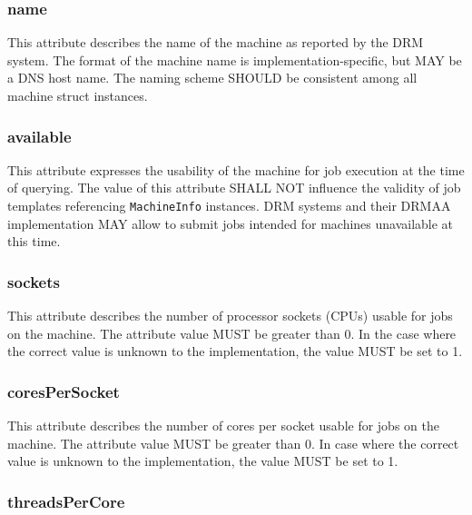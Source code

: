 \documentclass{article}
\newcommand{\h}[1]{\lstinline|#1|}
\newcommand{\rat}[1]{}
\begin{document}


\subsubsection{name}

This attribute describes the name of the machine as reported by the DRM system. The format of the machine name is implementation-specific, but MAY be a DNS host name. The naming scheme SHOULD be consistent among all machine struct instances. 

\subsubsection{available}

This attribute expresses the usability of the machine for job execution at the time of querying. The value of this attribute SHALL NOT influence the validity of job templates referencing \h{MachineInfo} instances. DRM systems and their DRMAA implementation MAY allow to submit jobs intended for machines unavailable at this time.

\rat{These jobs are expected to be queued until the machine becomes available again.}  

\subsubsection{sockets}
\label{sec:sockets}

This attribute describes the number of processor sockets (CPUs) usable for jobs on the machine. The attribute value MUST be greater than 0. In the case where the correct value is unknown to the implementation, the value MUST be set to 1.

\subsubsection{coresPerSocket}
\label{sec:cores}

This attribute describes the number of cores per socket usable for jobs on the machine. The attribute value MUST be greater than 0. In case where the correct value is unknown to the implementation, the value MUST be set to 1.

\subsubsection{threadsPerCore}
\end{document}
